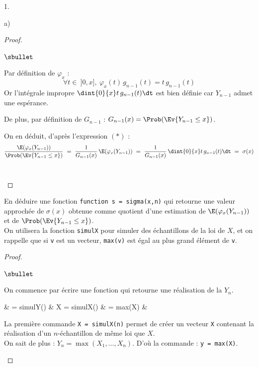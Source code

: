 \documentclass[11pt]{article}%
\begin{document}
\begin{noliste}{1.}
\begin{noliste}{a)}
\begin{proof}
\begin{noliste}{$\sbullet$}
	\item Par définition de $\varphi_x$ :
	\[
	  \forall t \in \ ]0,x], \ \varphi_x(t) \, g_{n-1}(t)
	  = t \, g_{n-1}(t)
	\]
	Or l'intégrale impropre $\dint{0}{x} t \,
	g_{n-1}(t) \dt$ est bien définie car $Y_{n-1}$ admet une 
	espérance.
	
	\item De plus, par définition de $G_{n-1}$ :
	$G_{n-1}(x) = \Prob(\Ev{Y_{n-1} \leq x})$.
	
	\item On en déduit, d'après l'expression $(*)$ :
	\[
	  \dfrac{\E(\varphi_x(Y_{n-1}))}{\Prob(\Ev{Y_{n-1} \leq x})}
	  \ = \ \dfrac{1}{G_{n-1}(x)} \, \E(\varphi_x(Y_{n-1}))
	  \ = \ \dfrac{1}{G_{n-1}(x)} \, \dint{0}{x} t \, 
	  g_{n-1}(t) \dt \ = \ \sigma(x)
	\]
	~\\[-1.4cm]
      \end{noliste}
    \end{proof}
    
    

    
    \item En déduire une fonction \Scilab{} {\tt function s = 
    sigma(x,n)} qui retourne une valeur approchée de $\sigma(x)$
    obtenue comme quotient d'une estimation de $\E(\varphi_x(Y_{n-1}))$
    et de $\Prob(\Ev{Y_{n-1} \leq x})$.\\
    On utilisera la fonction {\tt simulX} pour simuler des 
    échantillons de la loi de $X$, et on rappelle que si {\tt v} est 
    un vecteur, {\tt max(v)} est égal au plus grand élément de 
    {\tt v}.
    
    \begin{proof}~
      \begin{noliste}{$\sbullet$}
	\item On commence par écrire une fonction qui retourne une 
	réalisation de la \var $Y_n$.
	
	\begin{scilab}
	  &   = simulY() \nl %
	  & \quad X = simulX() \nl %
	  & \quad {} = max(X) \nl %
	  & 
	\end{scilab}
	
	La première commande {\tt X = simulX(n)} permet de créer un 
	vecteur {\tt X} contenant la réalisation d'un $n$-échantillon 
	de même loi que $X$.\\
	On sait de plus : $Y_n=\max(X_1, \ldots, X_n)$. D'où la 
	commande : {\tt y = max(X)}.
	

\end{noliste}
\end{proof}
\end{noliste}
\end{noliste}
\end{document}
